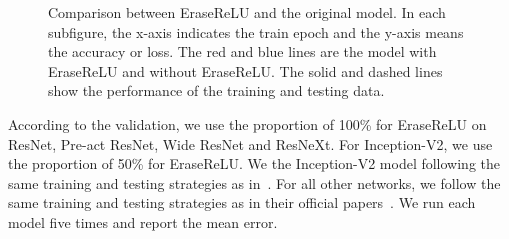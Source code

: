 \documentclass[10pt,twocolumn,letterpaper]{article}
\begin{document}
\begin{figure}[t]
\center
{}
\caption{Comparison between EraseReLU and the original model. In each subfigure, the x-axis indicates the train epoch and the y-axis means the accuracy or loss. The red and blue lines are the model with EraseReLU and without EraseReLU.
The solid and dashed lines show the performance of the training and testing data.
}
\label{fig:resnet_cifar100}
\end{figure}



According to the validation, we use the proportion of 100\% for EraseReLU on ResNet, Pre-act ResNet, Wide ResNet and ResNeXt.
For Inception-V2, we use the proportion of 50\% for EraseReLU.
We the Inception-V2 model following the same training and testing strategies as in~\cite{zagoruyko2016wide}.
For all other networks, we follow the same training and testing strategies as in their official papers~\cite{he2016deep,he2016identity,zagoruyko2016wide,xie2017aggregated}.
We run each model five times and report the mean error.
\end{document}
